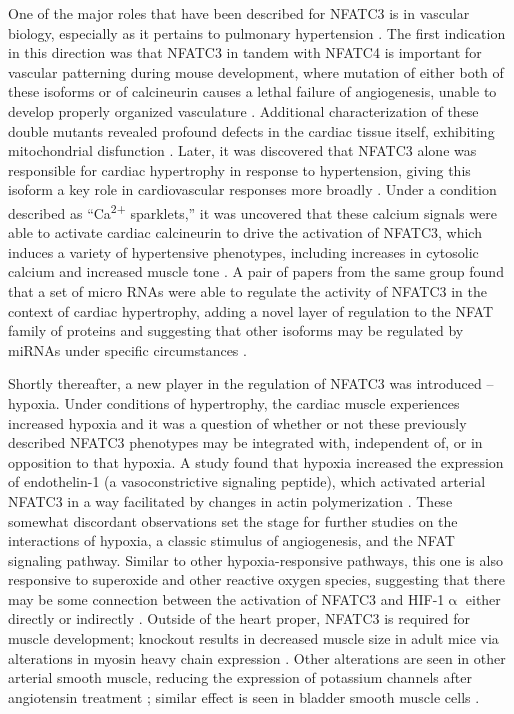 One of the major roles that have been described for NFATC3 is in vascular biology, especially as it pertains to pulmonary hypertension \citep{NievesCintron2007}. The first indication in this direction was that NFATC3 in tandem with NFATC4 is important for vascular patterning during mouse development, where mutation of either both of these isoforms or of calcineurin causes a lethal failure of angiogenesis, unable to develop properly organized vasculature \citep{Graef2001}. Additional characterization of these double mutants revealed profound defects in the cardiac tissue itself, exhibiting mitochondrial disfunction \citep{Kegley2001, Bushdid2003}. Later, it was discovered that NFATC3 alone was responsible for cardiac hypertrophy in response to hypertension, giving this isoform a key role in cardiovascular responses more broadly \citep{Wilkins2002}. Under a condition described as ``Ca\textsuperscript{2+} sparklets,'' it was uncovered that these calcium signals were able to activate cardiac calcineurin to drive the activation of NFATC3, which induces a variety of hypertensive phenotypes, including increases in cytosolic calcium and increased muscle tone \citep{NievesCintron2007}. A pair of papers from the same group found that a set of micro RNAs were able to regulate the activity of NFATC3 in the context of cardiac hypertrophy, adding a novel layer of regulation to the NFAT family of proteins and suggesting that other isoforms may be regulated by miRNAs under specific circumstances \citep{Lin2009, Wang2010}. 

Shortly thereafter, a new player in the regulation of NFATC3 was introduced -- hypoxia. Under conditions of hypertrophy, the cardiac muscle experiences increased hypoxia and it was a question of whether or not these previously described NFATC3 phenotypes may be integrated with, independent of, or in opposition to that hypoxia. A study found that hypoxia increased the expression of endothelin\hyp{}1 (a vasoconstrictive signaling peptide), which activated arterial NFATC3 in a way facilitated by changes in actin polymerization \citep{deFrutos2011}. These somewhat discordant observations set the stage for further studies on the interactions of hypoxia, a classic stimulus of angiogenesis, and the NFAT signaling pathway. Similar to other hypoxia\hyp{}responsive pathways, this one is also responsive to superoxide and other reactive oxygen species, suggesting that there may be some connection between the activation of NFATC3 and HIF\hyp{}1$\upalpha$ either directly or indirectly \citep{RamiroDiaz2014}. Outside of the heart proper, NFATC3 is required for muscle development; knockout results in decreased muscle size in adult mice via alterations in myosin heavy chain expression \citep{Kegley2001, Delling2000}. Other alterations are seen in other arterial smooth muscle, reducing the expression of potassium channels after angiotensin treatment \citep{Stevenson2001, Amberg2004}; similar effect is seen in bladder smooth muscle cells \citep{Layne2008}. 

